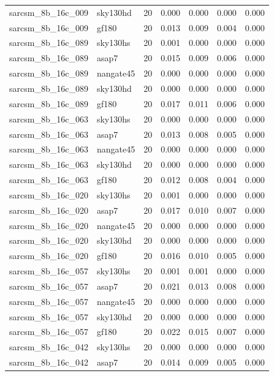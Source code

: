 \begin{tabular}{llrrrrr}
sarcsm\_8b\_16c\_009 & sky130hd & 20 & 0.000 & 0.000 & 0.000 & 0.000 \\
sarcsm\_8b\_16c\_009 & gf180 & 20 & 0.013 & 0.009 & 0.004 & 0.000 \\
sarcsm\_8b\_16c\_089 & sky130hs & 20 & 0.001 & 0.000 & 0.000 & 0.000 \\
sarcsm\_8b\_16c\_089 & asap7 & 20 & 0.015 & 0.009 & 0.006 & 0.000 \\
sarcsm\_8b\_16c\_089 & nangate45 & 20 & 0.000 & 0.000 & 0.000 & 0.000 \\
sarcsm\_8b\_16c\_089 & sky130hd & 20 & 0.000 & 0.000 & 0.000 & 0.000 \\
sarcsm\_8b\_16c\_089 & gf180 & 20 & 0.017 & 0.011 & 0.006 & 0.000 \\
sarcsm\_8b\_16c\_063 & sky130hs & 20 & 0.000 & 0.000 & 0.000 & 0.000 \\
sarcsm\_8b\_16c\_063 & asap7 & 20 & 0.013 & 0.008 & 0.005 & 0.000 \\
sarcsm\_8b\_16c\_063 & nangate45 & 20 & 0.000 & 0.000 & 0.000 & 0.000 \\
sarcsm\_8b\_16c\_063 & sky130hd & 20 & 0.000 & 0.000 & 0.000 & 0.000 \\
sarcsm\_8b\_16c\_063 & gf180 & 20 & 0.012 & 0.008 & 0.004 & 0.000 \\
sarcsm\_8b\_16c\_020 & sky130hs & 20 & 0.001 & 0.000 & 0.000 & 0.000 \\
sarcsm\_8b\_16c\_020 & asap7 & 20 & 0.017 & 0.010 & 0.007 & 0.000 \\
sarcsm\_8b\_16c\_020 & nangate45 & 20 & 0.000 & 0.000 & 0.000 & 0.000 \\
sarcsm\_8b\_16c\_020 & sky130hd & 20 & 0.000 & 0.000 & 0.000 & 0.000 \\
sarcsm\_8b\_16c\_020 & gf180 & 20 & 0.016 & 0.010 & 0.005 & 0.000 \\
sarcsm\_8b\_16c\_057 & sky130hs & 20 & 0.001 & 0.001 & 0.000 & 0.000 \\
sarcsm\_8b\_16c\_057 & asap7 & 20 & 0.021 & 0.013 & 0.008 & 0.000 \\
sarcsm\_8b\_16c\_057 & nangate45 & 20 & 0.000 & 0.000 & 0.000 & 0.000 \\
sarcsm\_8b\_16c\_057 & sky130hd & 20 & 0.000 & 0.000 & 0.000 & 0.000 \\
sarcsm\_8b\_16c\_057 & gf180 & 20 & 0.022 & 0.015 & 0.007 & 0.000 \\
sarcsm\_8b\_16c\_042 & sky130hs & 20 & 0.000 & 0.000 & 0.000 & 0.000 \\
sarcsm\_8b\_16c\_042 & asap7 & 20 & 0.014 & 0.009 & 0.005 & 0.000 \\

\end{tabular}
